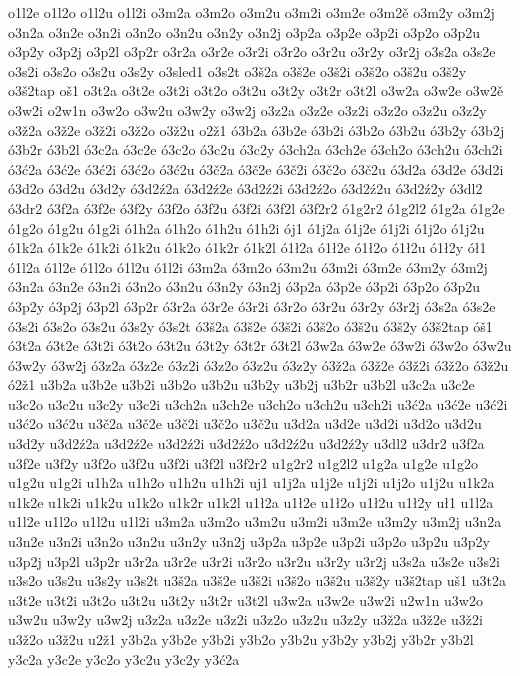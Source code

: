 {o1l2e
o1l2o
o1l2u
o1l2i
o3m2a
o3m2o
o3m2u
o3m2i
o3m2e
o3m2ě
o3m2y
o3m2j
o3n2a
o3n2e
o3n2i
o3n2o
o3n2u
o3n2y
o3n2j
o3p2a
o3p2e
o3p2i
o3p2o
o3p2u
o3p2y
o3p2j
o3p2l
o3p2r
o3r2a
o3r2e
o3r2i
o3r2o
o3r2u
o3r2y
o3r2j
o3s2a
o3s2e
o3s2i
o3s2o
o3s2u
o3s2y
o3sled1
o3s2t
o3š2a
o3š2e
o3š2i
o3š2o
o3š2u
o3š2y
o3š2tap
oš1
o3t2a
o3t2e
o3t2i
o3t2o
o3t2u
o3t2y
o3t2r
o3t2l
o3w2a
o3w2e
o3w2ě
o3w2i
o2w1n
o3w2o
o3w2u
o3w2y
o3w2j
o3z2a
o3z2e
o3z2i
o3z2o
o3z2u
o3z2y
o3ž2a
o3ž2e
o3ž2i
o3ž2o
o3ž2u
o2ž1                       
ó3b2a 
ó3b2e 
ó3b2i 
ó3b2o
ó3b2u
ó3b2y
ó3b2j
ó3b2r
ó3b2l
ó3c2a
ó3c2e
ó3c2o
ó3c2u
ó3c2y
ó3ch2a
ó3ch2e
ó3ch2o
ó3ch2u
ó3ch2i
ó3ć2a
ó3ć2e
ó3ć2i
ó3ć2o
ó3ć2u
ó3č2a
ó3č2e
ó3č2i
ó3č2o
ó3č2u
ó3d2a
ó3d2e
ó3d2i
ó3d2o
ó3d2u
ó3d2y
ó3d2ź2a
ó3d2ź2e
ó3d2ź2i
ó3d2ź2o
ó3d2ź2u
ó3d2ź2y
ó3dl2
ó3dr2
ó3f2a
ó3f2e
ó3f2y
ó3f2o
ó3f2u
ó3f2i
ó3f2l
ó3f2r2
ó1g2r2
ó1g2l2
ó1g2a
ó1g2e
ó1g2o
ó1g2u
ó1g2i
ó1h2a
ó1h2o
ó1h2u
ó1h2i
ój1
ó1j2a
ó1j2e
ó1j2i
ó1j2o
ó1j2u
ó1k2a
ó1k2e
ó1k2i
ó1k2u
ó1k2o
ó1k2r
ó1k2l
ó1ł2a
ó1ł2e
ó1ł2o
ó1ł2u
ó1ł2y
ół1
ó1l2a
ó1l2e
ó1l2o
ó1l2u
ó1l2i
ó3m2a
ó3m2o
ó3m2u
ó3m2i
ó3m2e
ó3m2y
ó3m2j
ó3n2a
ó3n2e
ó3n2i
ó3n2o
ó3n2u
ó3n2y
ó3n2j
ó3p2a
ó3p2e
ó3p2i
ó3p2o
ó3p2u
ó3p2y
ó3p2j
ó3p2l
ó3p2r
ó3r2a
ó3r2e
ó3r2i
ó3r2o
ó3r2u
ó3r2y
ó3r2j
ó3s2a
ó3s2e
ó3s2i
ó3s2o
ó3s2u
ó3s2y
ó3s2t
ó3š2a
ó3š2e
ó3š2i
ó3š2o
ó3š2u
ó3š2y
ó3š2tap
óš1
ó3t2a
ó3t2e
ó3t2i
ó3t2o
ó3t2u
ó3t2y
ó3t2r
ó3t2l
ó3w2a
ó3w2e
ó3w2i
ó3w2o
ó3w2u
ó3w2y
ó3w2j
ó3z2a
ó3z2e
ó3z2i
ó3z2o
ó3z2u
ó3z2y
ó3ž2a
ó3ž2e
ó3ž2i
ó3ž2o
ó3ž2u
ó2ž1                       
u3b2a 
u3b2e 
u3b2i 
u3b2o
u3b2u
u3b2y
u3b2j
u3b2r
u3b2l
u3c2a
u3c2e
u3c2o
u3c2u
u3c2y
u3c2i
u3ch2a
u3ch2e
u3ch2o
u3ch2u
u3ch2i
u3ć2a
u3ć2e
u3ć2i
u3ć2o
u3ć2u
u3č2a
u3č2e
u3č2i
u3č2o
u3č2u
u3d2a
u3d2e
u3d2i
u3d2o
u3d2u
u3d2y
u3d2ź2a
u3d2ź2e
u3d2ź2i
u3d2ź2o
u3d2ź2u
u3d2ź2y
u3dl2
u3dr2
u3f2a
u3f2e
u3f2y
u3f2o
u3f2u
u3f2i
u3f2l
u3f2r2
u1g2r2
u1g2l2
u1g2a
u1g2e
u1g2o
u1g2u
u1g2i
u1h2a
u1h2o
u1h2u
u1h2i
uj1
u1j2a
u1j2e
u1j2i
u1j2o
u1j2u
u1k2a
u1k2e
u1k2i
u1k2u
u1k2o
u1k2r
u1k2l
u1ł2a
u1ł2e
u1ł2o
u1ł2u
u1ł2y
uł1
u1l2a
u1l2e
u1l2o
u1l2u
u1l2i
u3m2a
u3m2o
u3m2u
u3m2i
u3m2e
u3m2y
u3m2j
u3n2a
u3n2e
u3n2i
u3n2o
u3n2u
u3n2y
u3n2j
u3p2a
u3p2e
u3p2i
u3p2o
u3p2u
u3p2y
u3p2j
u3p2l
u3p2r
u3r2a
u3r2e
u3r2i
u3r2o
u3r2u
u3r2y
u3r2j
u3s2a
u3s2e
u3s2i
u3s2o
u3s2u
u3s2y
u3s2t
u3š2a
u3š2e
u3š2i
u3š2o
u3š2u
u3š2y
u3š2tap
uš1
u3t2a
u3t2e
u3t2i
u3t2o
u3t2u
u3t2y
u3t2r
u3t2l
u3w2a
u3w2e
u3w2i
u2w1n
u3w2o
u3w2u
u3w2y
u3w2j
u3z2a
u3z2e
u3z2i
u3z2o
u3z2u
u3z2y
u3ž2a
u3ž2e
u3ž2i
u3ž2o
u3ž2u
u2ž1                       
y3b2a 
y3b2e 
y3b2i 
y3b2o
y3b2u
y3b2y
y3b2j
y3b2r
y3b2l
y3c2a
y3c2e
y3c2o
y3c2u
y3c2y
y3ć2a
}
